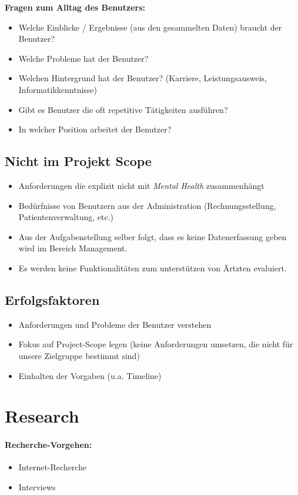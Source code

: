 \documentclass[a4paper]{scrreprt}
\begin{document}
\textbf{Fragen zum Alltag des Benutzers:}

\begin{itemize}
\item Welche Einblicke / Ergebnisse (aus den gesammelten Daten) braucht der Benutzer?
\item Welche Probleme hat der Benutzer?
\item Welchen Hintergrund hat der Benutzer? (Karriere, Leistungsausweis, Informatikkenntnisse)
\item Gibt es Benutzer die oft repetitive Tätigkeiten ausführen?
\item In welcher Position arbeitet der Benutzer?
\end{itemize}

\subsection{Nicht im Projekt Scope}

\begin{itemize}
\item Anforderungen die explizit nicht mit \textit{Mental Health} zusammenhängt
\item Bedürfnisse von Benutzern aus der Administration (Rechnungsstellung, Patientenverwaltung, etc.)
\item Aus der Aufgabenstellung selber folgt, dass es keine Datenerfassung geben wird im Bereich Management.
\item Es werden keine Funktionalitäten zum unterstützen von Ärtzten evaluiert. 
\end{itemize} 

\subsection{Erfolgsfaktoren}

\begin{itemize}
\item Anforderungen und Probleme der Benutzer verstehen
\item Fokus auf Project-Scope legen (keine Anforderungen umsetzen, die nicht für unsere Zielgruppe bestimmt sind)
\item Einhalten der Vorgaben (u.a. Timeline)
\end{itemize} 


\section{Research}
\paragraph{Recherche-Vorgehen:} 
\begin{itemize}
\item Internet-Recherche
\item Interviews
\end{itemize}
\end{document}
